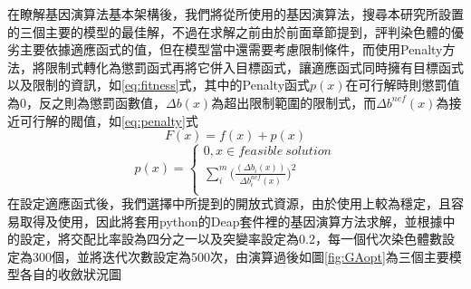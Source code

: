 在瞭解基因演算法基本架構後，我們將從\cite{Wu.etc}所使用的基因演算法，搜尋本研究所設置的三個主要的模型的最佳解，不過在求解之前由於前面章節提到，評判染色體的優劣主要依據適應函式的值，但在模型當中還需要考慮限制條件，而\cite{Wu.etc}使用Penalty方法，將限制式轉化為懲罰函式再將它併入目標函式，讓適應函式同時擁有目標函式以及限制的資訊，如\ref{eq:fitness}式，其中的Penalty函式$p(x)$在可行解時則懲罰值為0，反之則為懲罰函數值，$\Delta b(x)$為超出限制範圍的限制式，而$\Delta b^{nef}(x)$為接近可行解的閥值，如\ref{eq:penalty}式
\begin{equation}
F(x)=f(x)+p(x)
\label{eq:fitness}
\end{equation}
\begin{equation}
p(x)=
	\begin{cases}
	0,x\in feasible\ solution\\
	\sum_{i}^{m} \bigl(\frac{(\Delta b_{i}(x))}{\Delta b_{i}^{nef}(x)}\bigr)^{2}\\
	\end{cases}
\label{eq:penalty}
\end{equation}
在設定適應函式後，我們選擇\cite{rainville2012deap}中所提到的開放式資源，由於使用上較為穩定，且容易取得及使用，因此將套用python的Deap套件裡的基因演算方法求解，並根據\cite{Wu.etc}中的設定，將交配比率設為四分之一以及突變率設定為0.2，每一個代次染色體數設定為300個，並將迭代次數設定為500次，由演算過後如圖\ref{fig:GAopt}為三個主要模型各自的收斂狀況圖
